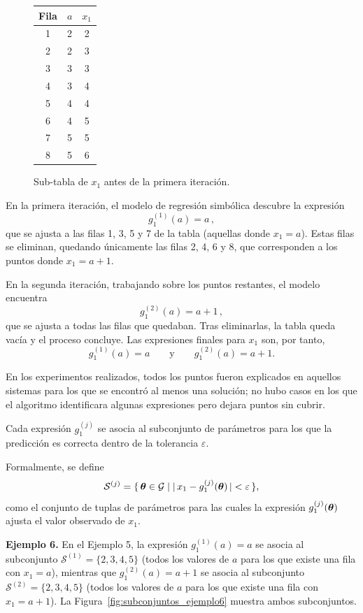 \begin{figure}[H]
\centering
\begin{tabular}{c|c|c}
Fila & \(a\) & \(x_1\) \\
\hline 1 & 2 & 2 \\
2 & 2 & 3 \\
3 & 3 & 3 \\
4 & 3 & 4 \\
5 & 4 & 4 \\
6 & 4 & 5 \\
7 & 5 & 5 \\
8 & 5 & 6
\end{tabular}
\caption{Sub-tabla de \(x_1\) antes de la primera iteración.} \label{fig:busqueda_iterativa_tabla}
\end{figure}

En la primera iteración, el modelo de regresión simbólica descubre la expresión
\[
g_1^{(1)}(a) = a\,,
\]
que se ajusta a las filas 1, 3, 5 y 7 de la tabla (aquellas donde
\(x_1 = a\)). Estas filas se eliminan, quedando únicamente las filas
2, 4, 6 y 8, que corresponden a los puntos donde \(x_1 = a + 1\).

En la segunda iteración, trabajando sobre los puntos restantes, el modelo encuentra
\[
g_1^{(2)}(a) = a + 1\,,
\]
que se ajusta a todas las filas que quedaban. Tras eliminarlas, la tabla queda vacía y el proceso concluye. Las expresiones finales para \(x_1\) son, por tanto,
\[
g_1^{(1)}(a) = a \qquad\text{y}\qquad g_1^{(2)}(a) = a + 1 .
\]

En los experimentos realizados, todos los puntos fueron explicados en aquellos sistemas para los que se encontró al menos una solución; no hubo casos en los que el algoritmo identificara algunas expresiones pero dejara puntos sin cubrir.

Cada expresión \(g_1^{(j)}\) se asocia al subconjunto de parámetros para los que la predicción es correcta dentro de la tolerancia
\(\varepsilon\).

Formalmente, se define
\[
\mathcal{S}^{(j)} = \{\,\boldsymbol{\theta} \in \mathcal{G} \mid |\,x_1 - g_1^{(j)}(\boldsymbol{\theta})\,| < \varepsilon \,\},
\]
como el conjunto de tuplas de parámetros para las cuales la expresión \(g_1^{(j)}(\boldsymbol{\theta})\) ajusta el valor observado de
\(x_1\).

\bigskip \noindent\textbf{Ejemplo 6.} En el Ejemplo 5, la expresión
\(g_1^{(1)}(a) = a\) se asocia al subconjunto
\(\mathcal{S}^{(1)} = \{2, 3, 4, 5\}\) (todos los valores de \(a\)
para los que existe una fila con \(x_1 = a\)), mientras que
\(g_1^{(2)}(a) = a + 1\) se asocia al subconjunto
\(\mathcal{S}^{(2)} = \{2, 3, 4, 5\}\) (todos los valores de \(a\)
para los que existe una fila con \(x_1 = a + 1\)). La Figura~\ref{fig:subconjuntos_ejemplo6} muestra ambos subconjuntos.

